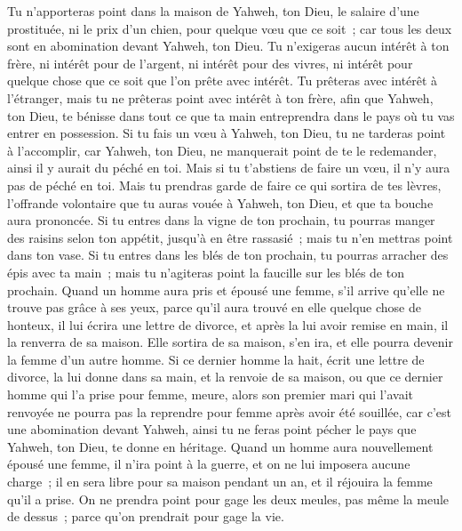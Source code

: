 \begin{multicols}{2}
Tu n'apporteras point dans la maison de Yahweh, ton Dieu, le salaire d'une prostituée, ni le prix d'un chien, pour quelque vœu que ce soit~; car tous les deux sont en abomination devant Yahweh, ton Dieu.
Tu n'exigeras aucun intérêt à ton frère, ni intérêt pour de l'argent, ni intérêt pour des vivres, ni intérêt pour quelque chose que ce soit que l'on prête avec intérêt.
Tu prêteras avec intérêt à l'étranger, mais tu ne prêteras point avec intérêt à ton frère, afin que Yahweh, ton Dieu, te bénisse dans tout ce que ta main entreprendra dans le pays où tu vas entrer en possession.
Si tu fais un vœu à Yahweh, ton Dieu, tu ne tarderas point à l'accomplir, car Yahweh, ton Dieu, ne manquerait point de te le redemander, ainsi il y aurait du péché en toi.
Mais si tu t'abstiens de faire un vœu, il n'y aura pas de péché en toi.
Mais tu prendras garde de faire ce qui sortira de tes lèvres, l'offrande volontaire que tu auras vouée à Yahweh, ton Dieu, et que ta bouche aura prononcée.
Si tu entres dans la vigne de ton prochain, tu pourras manger des raisins selon ton appétit, jusqu'à en être rassasié~; mais tu n'en mettras point dans ton vase.
Si tu entres dans les blés de ton prochain, tu pourras arracher des épis avec ta main~; mais tu n'agiteras point la faucille sur les blés de ton prochain.
\VerseOne{}Quand un homme aura pris et épousé une femme, s'il arrive qu'elle ne trouve pas grâce à ses yeux, parce qu'il aura trouvé en elle quelque chose de honteux, il lui écrira une lettre de divorce, et après la lui avoir remise en main, il la renverra de sa maison.
Elle sortira de sa maison, s'en ira, et elle pourra devenir la femme d'un autre homme.
Si ce dernier homme la hait, écrit une lettre de divorce, la lui donne dans sa main, et la renvoie de sa maison, ou que ce dernier homme qui l'a prise pour femme, meure,
alors son premier mari qui l'avait renvoyée ne pourra pas la reprendre pour femme après avoir été souillée, car c'est une abomination devant Yahweh, ainsi tu ne feras point pécher le pays que Yahweh, ton Dieu, te donne en héritage.
Quand un homme aura nouvellement épousé une femme, il n'ira point à la guerre, et on ne lui imposera aucune charge~; il en sera libre pour sa maison pendant un an, et il réjouira la femme qu'il a prise.
On ne prendra point pour gage les deux meules, pas même la meule de dessus~; parce qu'on prendrait pour gage la vie.

\end{multicols}

